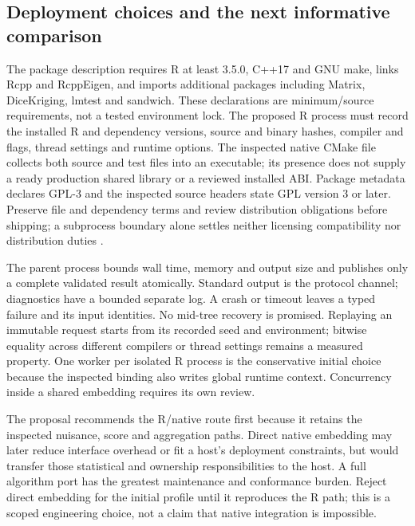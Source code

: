\subsection{Deployment choices and the next informative comparison}

The package description requires R at least 3.5.0, C++17 and GNU make,
links Rcpp and RcppEigen, and imports additional packages including
Matrix, DiceKriging, lmtest and sandwich. These declarations are
minimum/source requirements, not a tested environment lock. The proposed
R process must record the installed R and dependency versions, source
and binary hashes, compiler and flags, thread settings and runtime
options. The inspected native CMake file collects both source and test
files into an executable; its presence does not supply a ready
production shared library or a reviewed installed ABI. Package metadata
declares GPL-3 and the inspected source headers state GPL version 3 or
later. Preserve file and dependency terms and review distribution
obligations before shipping; a subprocess boundary alone settles neither
licensing compatibility nor distribution duties
\citep{exec13_grf_runtime}.

The parent process bounds wall time, memory and output size and
publishes only a complete validated result atomically. Standard output
is the protocol channel; diagnostics have a bounded separate log. A
crash or timeout leaves a typed failure and its input identities. No
mid-tree recovery is promised. Replaying an immutable request starts
from its recorded seed and environment; bitwise equality across
different compilers or thread settings remains a measured property. One
worker per isolated R process is the conservative initial choice because
the inspected binding also writes global runtime context. Concurrency
inside a shared embedding requires its own review.

The proposal recommends the R/native route first because it retains the
inspected nuisance, score and aggregation paths. Direct native embedding
may later reduce interface overhead or fit a host's deployment
constraints, but would transfer those statistical and ownership
responsibilities to the host. A full algorithm port has the greatest
maintenance and conformance burden. Reject direct embedding for the
initial profile until it reproduces the R path; this is a scoped
engineering choice, not a claim that native integration is impossible.

